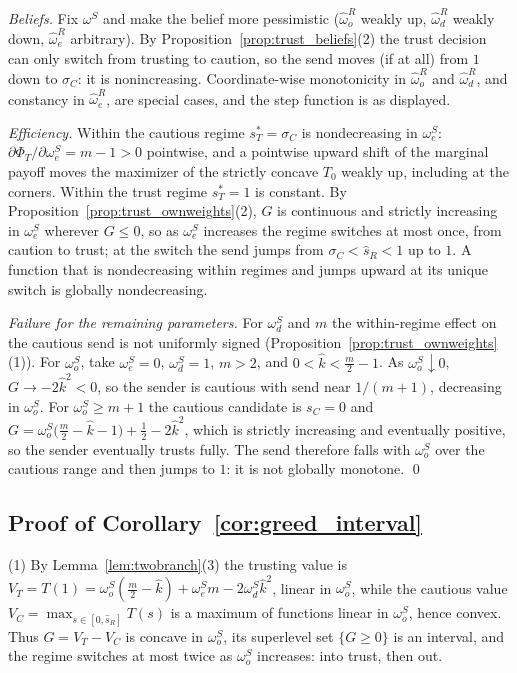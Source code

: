 \documentclass[11pt]{article}
\theoremstyle{plain}
\theoremstyle{remark}
\begin{document}
\emph{Beliefs.}  Fix $\omega^S$ and make the belief more pessimistic ($\hat\omega_o^{R}$ weakly up, $\hat\omega_d^{R}$ weakly down, $\hat\omega_e^{R}$ arbitrary).  By Proposition~\ref{prop:trust_beliefs}(2) the trust decision can only switch from trusting to caution, so the send moves (if at all) from $1$ down to $\sigma_C$: it is nonincreasing.  Coordinate-wise monotonicity in $\hat\omega_o^{R}$ and $\hat\omega_d^{R}$, and constancy in $\hat\omega_e^{R}$, are special cases, and the step function is as displayed.

\emph{Efficiency.}  Within the cautious regime $s_T^\ast=\sigma_C$ is nondecreasing in $\omega_e^S$: $\partial\Phi_T/\partial\omega_e^S=m-1>0$ pointwise, and a pointwise upward shift of the marginal payoff moves the maximizer of the strictly concave $T_0$ weakly up, including at the corners.  Within the trust regime $s_T^\ast=1$ is constant.  By Proposition~\ref{prop:trust_ownweights}(2), $G$ is continuous and strictly increasing in $\omega_e^S$ wherever $G\le0$, so as $\omega_e^S$ increases the regime switches at most once, from caution to trust; at the switch the send jumps from $\sigma_C<\hat s_R<1$ up to $1$.  A function that is nondecreasing within regimes and jumps upward at its unique switch is globally nondecreasing.

\emph{Failure for the remaining parameters.}  For $\omega_d^S$ and $m$ the within-regime effect on the cautious send is not uniformly signed (Proposition~\ref{prop:trust_ownweights}(1)).  For $\omega_o^S$, take $\omega_e^S=0$, $\omega_d^S=1$, $m>2$, and $0<\hat k<\tfrac m2-1$.  As $\omega_o^S\downarrow0$, $G\to-2\hat k^2<0$, so the sender is cautious with send near $1/(m+1)$, decreasing in $\omega_o^S$.  For $\omega_o^S\ge m+1$ the cautious candidate is $s_C=0$ and $G=\omega_o^S\big(\tfrac m2-\hat k-1\big)+\tfrac12-2\hat k^2$, which is strictly increasing and eventually positive, so the sender eventually trusts fully.  The send therefore falls with $\omega_o^S$ over the cautious range and then jumps to $1$: it is not globally monotone.
\qed

\subsection*{Proof of Corollary~\ref{cor:greed_interval}}

(1) By Lemma~\ref{lem:twobranch}(3) the trusting value is $V_T=T(1)=\omega_o^S(\tfrac m2-\hat k)+\omega_e^S m-2\omega_d^S\hat k^2$, linear in $\omega_o^S$, while the cautious value $V_C=\max_{s\in[0,\hat s_R]}T(s)$ is a maximum of functions linear in $\omega_o^S$, hence convex.  Thus $G=V_T-V_C$ is concave in $\omega_o^S$, its superlevel set $\{G\ge0\}$ is an interval, and the regime switches at most twice as $\omega_o^S$ increases: into trust, then out.
\end{document}
